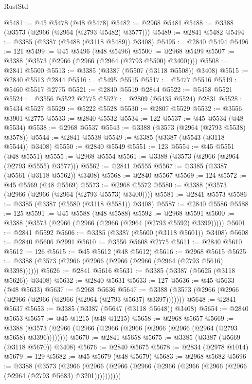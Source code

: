 \begin{lexlean}{RustStd}
\begin{coremodule}
@5481 := @45 @5478 (@48 @5478)
@5482 := @2968 @5481
@5488 := @3388 (@3573 (@2966 (@2964 (@2793 @5482) @3577)))
@5489 := @2841 @5482
@5494 := @3385 (@3387 (@5488 (@3118 @5489)) @3408)
@5495 := @2840 @5494
@5496 := 121
@5499 := @45 @5496 (@48 @5496)
@5500 := @2968 @5499
@5507 := @3388 (@3573 (@2966 (@2966 (@2964 (@2793 @5500) @3400))))
@5508 := @2841 @5500
@5513 := @3385 (@3387 (@5507 (@3118 @5508)) @3408)
@5515 := @2840 @5513 @2844
@5516 := @5495 @5515
@5517 := @5477 @5516
@5519 := @5460 @5517 @2775
@5521 := @2840 @5519 @2844
@5522 := @5458 @5521
@5524 := @3556 @5522 @2775
@5527 := @2809 (@5435 @5524) @2831
@5528 := @5434 @5527
@5529 := @5222 @5528
@5530 := @2807 @5529
@5532 := @3556 @3901 @2775
@5533 := @2840 @5532
@5534 := 122
@5537 := @45 @5534 (@48 @5534)
@5538 := @2968 @5537
@5543 := @3388 (@3573 (@2964 (@2793 @5538) @3578))
@5544 := @2841 @5538
@5549 := @3385 (@3387 (@5543 (@3118 @5544)) @3408)
@5550 := @2840 @5549
@5551 := 123
@5554 := @45 @5551 (@48 @5551)
@5555 := @2968 @5554
@5561 := @3388 (@3573 (@2966 (@2964 (@2793 @5555) @3577)))
@5562 := @2841 @5555
@5567 := @3385 (@3387 (@5561 (@3118 @5562)) @3408)
@5568 := @2840 @5567
@5569 := 124
@5572 := @45 @5569 (@48 @5569)
@5573 := @2968 @5572
@5580 := @3388 (@3573 (@2966 (@2966 (@2964 (@2793 @5573) @3400))))
@5581 := @2841 @5573
@5586 := @3385 (@3387 (@5580 (@3118 @5581)) @3408)
@5587 := @2840 @5586
@5588 := 125
@5591 := @45 @5588 (@48 @5588)
@5592 := @2968 @5591
@5600 := @3388 (@3573 (@2966 (@2966 (@2966 (@2964 (@2793 @5592) @3399)))))
@5601 := @2841 @5592
@5606 := @3385 (@3387 (@5600 (@3118 @5601)) @3408)
@5608 := @2840 @5606 @2991
@5610 := @3556 @5608 @2775
@5611 := @2840 @5610
@5612 := 126
@5615 := @45 @5612 (@48 @5612)
@5616 := @2968 @5615
@5625 := @3388 (@3573 (@2966 (@2966 (@2966 (@2966 (@2964 (@2793 @5616) @3398))))))
@5626 := @2841 @5616
@5631 := @3385 (@3387 (@5625 (@3118 @5626)) @3408)
@5632 := @2840 @5631
@5633 := 127
@5636 := @45 @5633 (@48 @5633)
@5637 := @2968 @5636
@5647 := @3388 (@3573 (@2966 (@2966 (@2966 (@2966 (@2966 (@2964 (@2793 @5637) @3397)))))))
@5648 := @2841 @5637
@5653 := @3385 (@3387 (@5647 (@3118 @5648)) @3408)
@5654 := @2840 @5653
@5657 := @45 @1215 (@48 @1215)
@5658 := @2968 @5657
@5669 := @3388 (@3573 (@2966 (@2966 (@2966 (@2966 (@2966 (@2966 (@2964 (@2793 @5658) @3396))))))))
@5670 := @2841 @5658
@5675 := @3385 (@3387 (@5669 (@3118 @5670)) @3408)
@5676 := @2840 @5675
@5678 := @2834 (@2978 @1014)
@5679 := 129
@5682 := @45 @5679 (@48 @5679)
@5683 := @2968 @5682
@5696 := @3388
    (@3573
      (@2966 (@2966 (@2966 (@2966 (@2966 (@2966 (@2966 (@2966 (@2964 (@2793 @5683) @3201))))))))))

\end{coremodule}
\end{lexlean}

